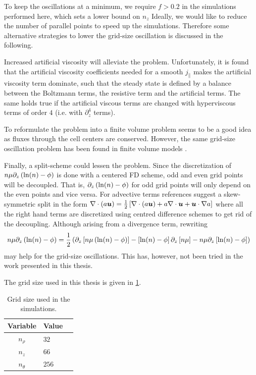 To keep the oscillations at a minimum, we require $f > 0.2$ in the simulations performed here, which sets a lower bound on $n_z$
Ideally, we would like to reduce the number of parallel points to speed up the simulations.
Therefore some alternative strategies to lower the grid-size oscillation is discussed in the following.

Increased artificial viscosity will alleviate the problem.
Unfortunately, it is found that the artificial viscosity coefficients needed for a smooth $j_\|$ makes the artificial viscosity term dominate, such that the steady state is defined by a balance between the Boltzmann terms, the resistive term and the artificial terms.
The same holds true if the artificial viscous terms are changed with hyperviscous terms of order $4$ (i.e. with $\partial_z^4$ terms).

To reformulate the problem into a finite volume problem seems to be a good idea as fluxes through the cell centers are conserved.
However, the same grid-size oscillation problem has been found in finite volume models \cite{Dudson2017Private}.

Finally, a split-scheme could lessen the problem.
Since the discretization of $n\mu\partial_z\left(\ln(n)-\phi\right)$ is done with a centered FD scheme, odd and even grid points will be decoupled.
That is, $\partial_z\left(\ln(n)-\phi\right)$ for odd grid points will only depend on the even points and vice versa.
For advective terms references \cite{Honein2004,Pirozzoli2011} suggest a skew-symmetric split in the form $\nabla\cdot\left(a\boldsymbol{u}\right) = \frac{1}{2}\left[\nabla\cdot\left(a\boldsymbol{u}\right) + a\nabla\cdot\boldsymbol{u} + \boldsymbol{u}\cdot\nabla a\right]$ where all the right hand terms are discretized using centred difference schemes to get rid of the decoupling.
Although arising from a divergence term, rewriting
%
\begin{align*}
    n\mu\partial_z\left(\ln(n)-\phi\right) =
    \frac{1}{2}\left(
    \partial_z\left[n\mu\left(\ln(n)-\phi\right)\right]-\left[\ln(n)-\phi\right]\partial_z\left[n\mu\right]
    - n\mu\partial_z\left[\ln(n)-\phi\right]
    \right)
\end{align*}
%
may help for the grid-size oscillations.
This has, however, not been tried in the work presented in this thesis.

The grid size used in this thesis is given in \cref{tb:grid}.
%
\begin{table}[!htb]
      \centering
      \caption{Grid size used in the simulations.}
        \begin{tabular}{c|ll}
        \hline\hline
        Variable & Value \\
        \hline
        $n_\rho$   & $32$  \\
        $n_z$      & $66$  \\
        $n_\theta$ & $256$ \\
        \hline\hline
        \end{tabular}
        \label{tb:grid}
\end{table}

